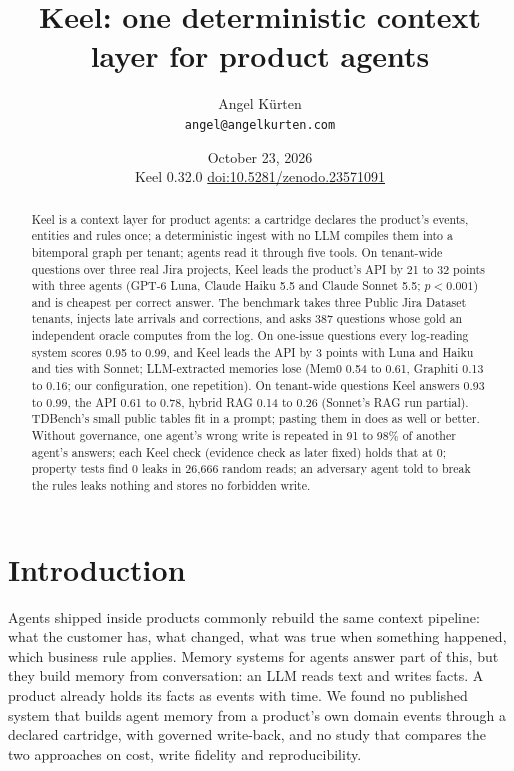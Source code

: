 \documentclass{article}
\title{Keel: one deterministic context layer for product agents}
\date{October 23, 2026 \\ \small Keel 0.32.0 \quad \href{https://doi.org/10.5281/zenodo.23571091}{doi:10.5281/zenodo.23571091}}
\author{Angel Kürten\\
  \texttt{angel@angelkurten.com}}
\begin{document}
\maketitle

\begin{abstract}
Keel is a context layer for product agents: a cartridge declares the product's events, entities and rules once; a deterministic ingest with no LLM compiles them into a bitemporal graph per tenant; agents read it through five tools. On tenant-wide questions over three real Jira projects, Keel leads the product's API by 21 to 32 points with three agents (GPT-6 Luna, Claude Haiku 5.5 and Claude Sonnet 5.5; $p < 0.001$) and is cheapest per correct answer. The benchmark takes three Public Jira Dataset tenants, injects late arrivals and corrections, and asks 387 questions whose gold an independent oracle computes from the log. On one-issue questions every log-reading system scores 0.95 to 0.99, and Keel leads the API by 3 points with Luna and Haiku and ties with Sonnet; LLM-extracted memories lose (Mem0 0.54 to 0.61, Graphiti 0.13 to 0.16; our configuration, one repetition). On tenant-wide questions Keel answers 0.93 to 0.99, the API 0.61 to 0.78, hybrid RAG 0.14 to 0.26 (Sonnet's RAG run partial). TDBench's small public tables fit in a prompt; pasting them in does as well or better. Without governance, one agent's wrong write is repeated in 91 to 98\% of another agent's answers; each Keel check (evidence check as later fixed) holds that at 0; property tests find 0 leaks in 26,666 random reads; an adversary agent told to break the rules leaks nothing and stores no forbidden write.
\end{abstract}

\section{Introduction}
\label{sec:intro}

Agents shipped inside products commonly rebuild the same context pipeline: what the customer has, what changed, what was true when something happened, which business rule applies. Memory systems for agents answer part of this, but they build memory from conversation: an LLM reads text and writes facts. A product already holds its facts as events with time. We found no published system that builds agent memory from a product's own domain events through a declared cartridge, with governed write-back, and no study that compares the two approaches on cost, write fidelity and reproducibility.
\end{document}
